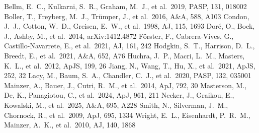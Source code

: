 \documentclass{aastex701}
\begin{document}

\begin{thebibliography}{}
 Bellm, E.~C., Kulkarni, S.~R., Graham, M.~J., et al.\ 2019, PASP, 131, 018002
 Boller, T., Freyberg, M.~J., Tr{\"u}mper, J., et al.\ 2016, A\&A, 588, A103
 Condon, J.~J., Cotton, W.~D., Greisen, E.~W., et al.\ 1998, AJ, 115, 1693
 Dor{\'e}, O., Bock, J., Ashby, M., et al.\ 2014, arXiv:1412.4872
 F{\"o}rster, F., Cabrera-Vives, G., Castillo-Navarrete, E., et al.\ 2021, AJ, 161, 242
 Hodgkin, S.~T., Harrison, D.~L., Breedt, E., et al.\ 2021, A\&A, 652, A76
 Huchra, J.~P., Macri, L.~M., Masters, K.~L., et al.\ 2012, ApJS, 199, 26
 Jiang, N., Wang, T., Hu, X., et al.\ 2021, ApJS, 252, 32
 Lacy, M., Baum, S.~A., Chandler, C.~J., et al.\ 2020, PASP, 132, 035001
 Mainzer, A., Bauer, J., Cutri, R.~M., et al.\ 2014, ApJ, 792, 30
 Masterson, M., De, K., Panagiotou, C., et al.\ 2024, ApJ, 961, 211
 Necker, J., Graikou, E., Kowalski, M., et al.\ 2025, A\&A, 695, A228
 Smith, N., Silverman, J.~M., Chornock, R., et al.\ 2009, ApJ, 695, 1334
 Wright, E.~L., Eisenhardt, P.~R.~M., Mainzer, A.~K., et al.\ 2010, AJ, 140, 1868
\end{thebibliography}
\end{document}
